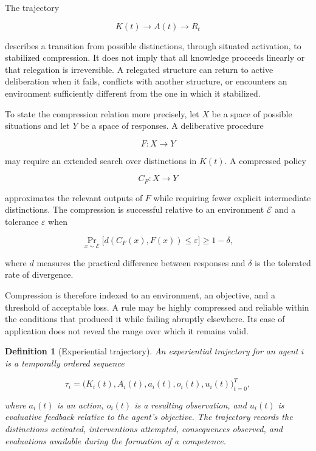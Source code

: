 \documentclass[11pt]{article}
\newtheorem{definition}[proposition]{Definition}
\begin{document}
The trajectory

\[
K(t) \longrightarrow A(t) \longrightarrow R_t
\]

describes a transition from possible distinctions, through situated activation, to stabilized compression. It does not imply that all knowledge proceeds linearly or that relegation is irreversible. A relegated structure can return to active deliberation when it fails, conflicts with another structure, or encounters an environment sufficiently different from the one in which it stabilized.

To state the compression relation more precisely, let $X$ be a space of possible situations and let $Y$ be a space of responses. A deliberative procedure

\[
F : X \to Y
\]

may require an extended search over distinctions in $K(t)$. A compressed policy

\[
C_F : X \to Y
\]

approximates the relevant outputs of $F$ while requiring fewer explicit intermediate distinctions. The compression is successful relative to an environment $\mathcal{E}$ and a tolerance $\varepsilon$ when

\[
\Pr_{x \sim \mathcal{E}}
\bigl[d(C_F(x),F(x)) \leq \varepsilon\bigr]
\geq 1-\delta,
\]

where $d$ measures the practical difference between responses and $\delta$ is the tolerated rate of divergence.

Compression is therefore indexed to an environment, an objective, and a threshold of acceptable loss. A rule may be highly compressed and reliable within the conditions that produced it while failing abruptly elsewhere. Its ease of application does not reveal the range over which it remains valid.

\begin{definition}[Experiential trajectory]
An experiential trajectory for an agent $i$ is a temporally ordered sequence

\[
\tau_i =
\bigl(
K_i(t),A_i(t),a_i(t),o_i(t),u_i(t)
\bigr)_{t=0}^{T},
\]

where $a_i(t)$ is an action, $o_i(t)$ is a resulting observation, and $u_i(t)$ is evaluative feedback relative to the agent's objective. The trajectory records the distinctions activated, interventions attempted, consequences observed, and evaluations available during the formation of a competence.
\end{definition}
\end{document}

